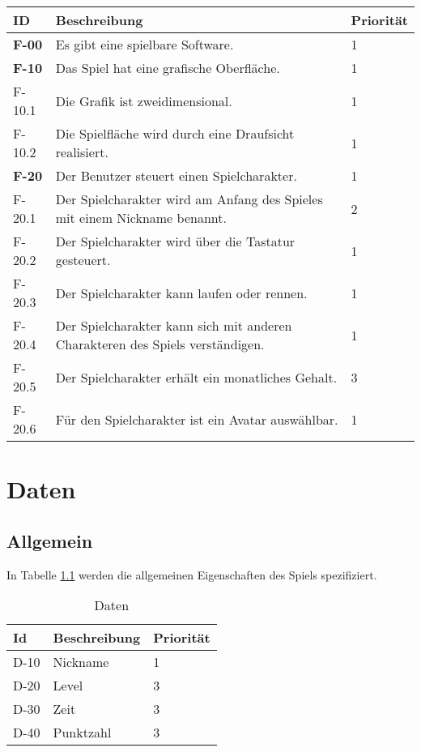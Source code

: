 \begin{longtable}{|l|p{10cm}|l|}
    \toprule
    \textbf{ID} & \textbf{Beschreibung} & \textbf{Priorität} \\
    \hline
    \endhead

    \hline
    \endfoot
    \textbf{F-00} & Es gibt eine spielbare Software. & 1 \\
    
    \hline
    \textbf{F-10} & Das Spiel hat eine grafische Oberfläche. & 1 \\
    F-10.1 & Die Grafik ist zweidimensional. & 1 \\
    F-10.2 & Die Spielfläche wird durch eine Draufsicht realisiert. & 1 \\

    \hline
    \textbf{F-20} & Der Benutzer steuert einen Spielcharakter. & 1 \\
    F-20.1 & Der Spielcharakter wird am Anfang des Spieles mit einem Nickname benannt. & 2 \\
    F-20.2 & Der Spielcharakter wird über die Tastatur gesteuert. & 1 \\
    F-20.3 & Der Spielcharakter kann laufen oder rennen. & 1\\
    F-20.4 & Der Spielcharakter kann sich mit anderen Charakteren des Spiels verständigen. & 1\\
    F-20.5 & Der Spielcharakter erhält ein monatliches Gehalt. & 3\\
    F-20.6 & Für den Spielcharakter ist ein Avatar auswählbar. & 1\\

\end{longtable}

\chapter{Daten}

\section{Allgemein}
In Tabelle \ref{daten:allgemein} werden die allgemeinen Eigenschaften des Spiels spezifiziert.

\begin{table}[H]
    \caption{Daten}
    \label{daten:allgemein}
    \begin{tabularx}{\textwidth}{|l|X|l|}
        \toprule
        \textbf{Id} & \textbf{Beschreibung} & \textbf{Priorität}\\
        \endhead
        \hline
	D-10 & Nickname & 1 \\
	D-20 & Level & 3 \\
	D-30 & Zeit & 3 \\
	D-40 & Punktzahl & 3 \\
        \hline
    \end{tabularx}
\end{table}


